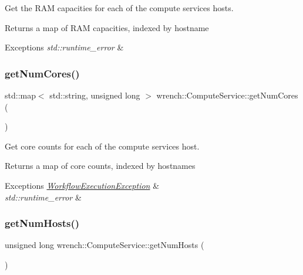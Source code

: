 Get the R\+AM capacities for each of the compute service\textquotesingle{}s hosts. 

\begin{DoxyReturn}{Returns}
a map of R\+AM capacities, indexed by hostname
\end{DoxyReturn}

\begin{DoxyExceptions}{Exceptions}
{\em std\+::runtime\+\_\+error} & \\
\hline
\end{DoxyExceptions}
\mbox{\label{classwrench_1_1_compute_service_a0d88426f33110e811771f73f39c6458a}} 
\subsubsection{\texorpdfstring{get\+Num\+Cores()}{getNumCores()}}
{\footnotesize\ttfamily std\+::map$<$ std\+::string, unsigned long $>$ wrench\+::\+Compute\+Service\+::get\+Num\+Cores (\begin{DoxyParamCaption}{ }\end{DoxyParamCaption})}



Get core counts for each of the compute service\textquotesingle{}s host. 

\begin{DoxyReturn}{Returns}
a map of core counts, indexed by hostnames
\end{DoxyReturn}

\begin{DoxyExceptions}{Exceptions}
{\em \hyperlink{classwrench_1_1_workflow_execution_exception}{Workflow\+Execution\+Exception}} & \\
\hline
{\em std\+::runtime\+\_\+error} & \\
\hline
\end{DoxyExceptions}
\mbox{\label{classwrench_1_1_compute_service_a1b576a22529bd638e6998f0513a44b36}} 
\subsubsection{\texorpdfstring{get\+Num\+Hosts()}{getNumHosts()}}
{\footnotesize\ttfamily unsigned long wrench\+::\+Compute\+Service\+::get\+Num\+Hosts (\begin{DoxyParamCaption}{ }\end{DoxyParamCaption})}



